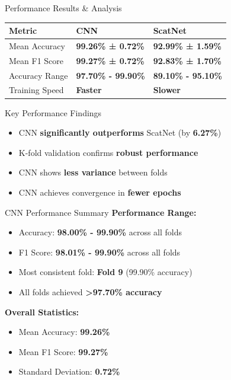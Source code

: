\documentclass[aspectratio=169,8pt]{beamer}  %
\begin{document}
\begin{frame}{Performance Results \& Analysis}
\begin{table}
\begin{tabular}{lll}
\toprule
Metric & CNN & ScatNet \\
\midrule
Mean Accuracy & \textbf{99.26\% ± 0.72\%} & \textbf{92.99\% ± 1.59\%} \\
Mean F1 Score & \textbf{99.27\% ± 0.72\%} & \textbf{92.83\% ± 1.70\%} \\
Accuracy Range & \textbf{97.70\% - 99.90\%} & \textbf{89.10\% - 95.10\%} \\
Training Speed & \textbf{Faster} & \textbf{Slower} \\
\bottomrule
\end{tabular}
\end{table}

\begin{block}{Key Performance Findings}
\begin{itemize}
\item CNN \textbf{significantly outperforms} ScatNet (by \textbf{6.27\%})
\item K-fold validation confirms \textbf{robust performance}
\item CNN shows \textbf{less variance} between folds
\item CNN achieves convergence in \textbf{fewer epochs}
\end{itemize}
\end{block}
\end{frame}

\begin{frame}{CNN Performance Summary}
\textbf{Performance Range:}
\begin{itemize}
\item Accuracy: \textbf{98.00\% - 99.90\%} across all folds
\item F1 Score: \textbf{98.01\% - 99.90\%} across all folds
\item Most consistent fold: \textbf{Fold 9} (99.90\% accuracy)
\item All folds achieved \textbf{>97.70\% accuracy}
\end{itemize}

\textbf{Overall Statistics:}
\begin{itemize}
\item Mean Accuracy: \textbf{99.26\%}
\item Mean F1 Score: \textbf{99.27\%}
\item Standard Deviation: \textbf{0.72\%}
\end{itemize}
\end{frame}
\end{document}
